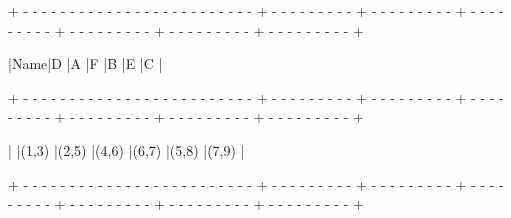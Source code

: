\vspace{\baselineskip}
\begin{tcolorbox}

{\tiny{+ - - - - - - - - - - - - - - - - - - - - - - - - - + - - - - - - - - - + - - - - - - - - - + - - - - - - - - - + - - - - - - - - - + - - - - - - - - - + - - - - - - - - - +}}

\hspace{0.4mm}|\hspace{17.6mm}Name\hspace{17.6mm}|\hspace{6.57mm}D\hspace{6.57mm} |\hspace{6.57mm}A\hspace{6.57mm} |\hspace{6.57mm}F\hspace{6.57mm} |\hspace{6.57mm}B\hspace{6.57mm} |\hspace{6.57mm}E\hspace{6.57mm} |\hspace{6.8mm}C\hspace{6.8mm} |

{\tiny{+ - - - - - - - - - - - - - - - - - - - - - - - - - + - - - - - - - - - + - - - - - - - - - + - - - - - - - - - + - - - - - - - - - + - - - - - - - - - + - - - - - - - - - +}}

\hspace{0.4mm}|\hspace{0.7mm}
|\hspace{3.85mm}(1,3)\hspace{3.85mm} |\hspace{3.85mm}(2,5)\hspace{3.85mm} |\hspace{3.85mm}(4,6)\hspace{3.85mm} |\hspace{3.85mm}(6,7)\hspace{3.85mm} |\hspace{3.85mm}(5,8)\hspace{3.85mm} |\hspace{3.85mm}(7,9)\hspace{3.85mm} |

{\tiny{+ - - - - - - - - - - - - - - - - - - - - - - - - - + - - - - - - - - - + - - - - - - - - - + - - - - - - - - - + - - - - - - - - - + - - - - - - - - - + - - - - - - - - - +}}


\end{tcolorbox}

